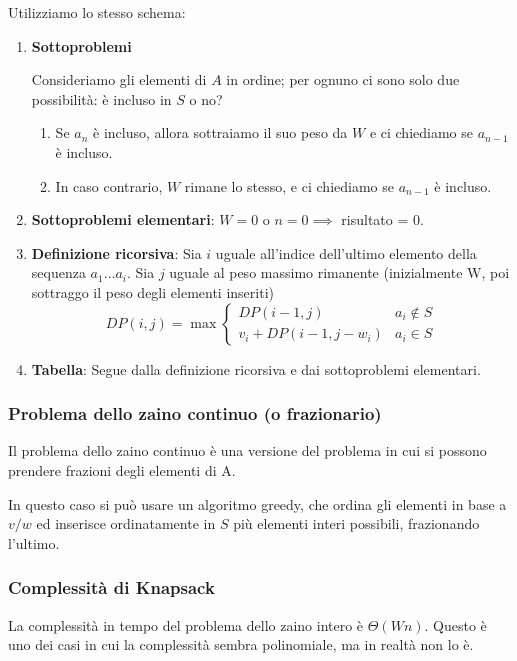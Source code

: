 \documentclass[a4paper,10pt]{article}
\theoremstyle{definition}
\begin{document}
Utilizziamo lo stesso schema:

\begin{enumerate}
 \item \textbf{Sottoproblemi}
 
 Consideriamo gli elementi di $A$ in ordine; per ognuno ci sono solo due possibilità: è incluso in $S$ o no? 
 \begin{enumerate}
  \item Se $a_n$ è incluso, allora sottraiamo il suo peso da $W$ e ci chiediamo se $a_{n-1}$ è incluso.
  \item In caso contrario, $W$ rimane lo stesso, e ci chiediamo se $a_{n-1}$ è incluso.
 \end{enumerate}
 \item \textbf{Sottoproblemi elementari}: $W = 0$ o $n = 0 \implies$ risultato = 0.
 \item \textbf{Definizione ricorsiva}: Sia $i$ uguale all'indice dell'ultimo elemento della sequenza $a_1 \hdots a_i$. Sia $j$ uguale al peso massimo rimanente (inizialmente W, poi sottraggo il peso degli elementi inseriti)
 \[DP(i, j) = \max\begin{cases}
                   DP(i-1, j) & a_i \notin S\\
                   v_i + DP(i-1, j-w_i) & a_i \in S
                  \end{cases}
\]

\item \textbf{Tabella}: Segue dalla definizione ricorsiva e dai sottoproblemi elementari.

\end{enumerate}

\subsubsection{Problema dello zaino continuo (o frazionario)}
Il problema dello zaino continuo è una versione del problema in cui si possono prendere frazioni degli elementi di A. \smallskip

In questo caso si può usare un algoritmo greedy, che ordina gli elementi in base a $v/w$ ed inserisce ordinatamente in $S$ più elementi interi possibili, frazionando l'ultimo.

\subsubsection{Complessità di Knapsack}
La complessità in tempo del problema dello zaino intero è $\Theta(W n)$. Questo è uno dei casi in cui la complessità sembra polinomiale, ma in realtà non lo è. \smallskip
\end{document}
